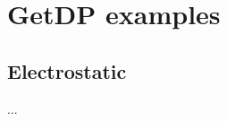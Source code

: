 
\part{GetDP examples}

\chapter{Electrostatic}

\begin{slide}

...

\end{slide}


\background{}{}{}

